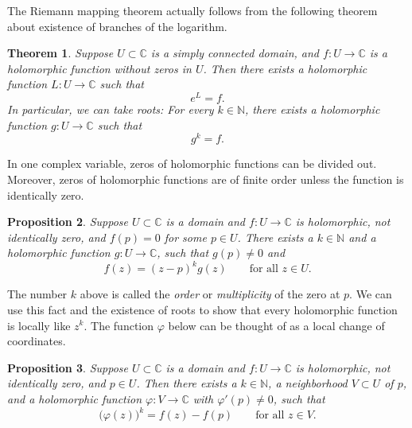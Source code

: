 \documentclass[12pt,openany]{book}
\newcommand{\C}{{\mathbb{C}}}
\newcommand{\N}{{\mathbb{N}}}
\theoremstyle{plain}
\newtheorem{thm}{Theorem}[section]
\newtheorem{prop}[thm]{Proposition}
\theoremstyle{remark}
\theoremstyle{definition}
\theoremstyle{exercise}
\theoremstyle{example}
\begin{document}
\pagebreak[2]
The Riemann mapping theorem actually follows from the following
theorem about existence of branches of the logarithm.

\begin{thm}
Suppose $U \subset \C$ is a simply connected domain, and $f \colon U \to \C$
is a holomorphic function without zeros in $U$.  Then there exists a
holomorphic function $L \colon U \to \C$ such that
\begin{equation*}
e^L = f .
\end{equation*}
In particular, we can take roots:
For every $k \in \N$, there exists a holomorphic function
$g \colon U \to \C$ such that
\begin{equation*}
g^k = f .
\end{equation*}
\end{thm}

In one complex variable, zeros of holomorphic functions
can be divided out.  Moreover, zeros
of holomorphic functions are of finite order unless
the function is identically zero.

\begin{prop}
Suppose $U \subset \C$ is a domain and
$f \colon U \to \C$ is holomorphic, not identically zero, and $f(p) = 0$
for some $p \in U$.  There exists a $k \in \N$ and
a holomorphic function $g \colon U \to \C$,
such that $g(p) \neq 0$ and
\begin{equation*}
f(z) = {(z-p)}^k g(z) \qquad \text{for all $z \in U$.}
\end{equation*}
\end{prop}

The number $k$ above is called the \emph{order}
or \emph{multiplicity}
of the zero at $p$.
We can use this fact and the existence of roots to show that every
holomorphic function is locally like $z^k$.  The function $\varphi$
below can be thought of as a local change of coordinates.

\begin{prop}
Suppose $U \subset \C$ is a domain and
$f \colon U \to \C$ is holomorphic, not identically zero, and $p \in U$.
Then there exists a $k \in \N$,
a neighborhood $V \subset U$ of $p$,  and
a holomorphic function $\varphi \colon V \to \C$ with
$\varphi'(p) \neq 0$, such that
\begin{equation*}
{\bigl(\varphi(z)\bigr)}^k = f(z) - f(p)
\qquad \text{for all $z \in V$.}
\end{equation*}
\end{prop}
\end{document}
